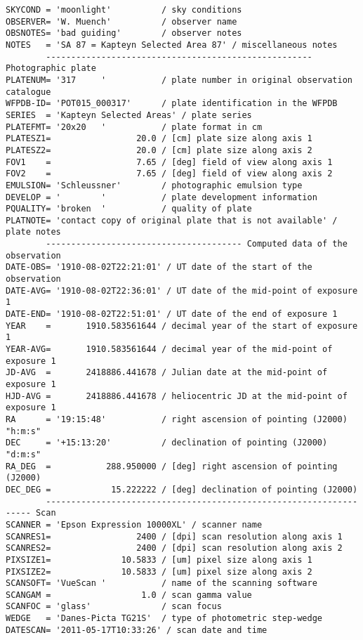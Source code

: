 \documentclass[11pt]{ivoa}
\begin{document}
\begin{lstlisting}
SKYCOND = 'moonlight'          / sky conditions
OBSERVER= 'W. Muench'          / observer name
OBSNOTES= 'bad guiding'        / observer notes
NOTES   = 'SA 87 = Kapteyn Selected Area 87' / miscellaneous notes
        ----------------------------------------------------- Photographic plate
PLATENUM= '317     '           / plate number in original observation catalogue
WFPDB-ID= 'POT015_000317'      / plate identification in the WFPDB
SERIES  = 'Kapteyn Selected Areas' / plate series
PLATEFMT= '20x20   '           / plate format in cm
PLATESZ1=                 20.0 / [cm] plate size along axis 1
PLATESZ2=                 20.0 / [cm] plate size along axis 2
FOV1    =                 7.65 / [deg] field of view along axis 1
FOV2    =                 7.65 / [deg] field of view along axis 2
EMULSION= 'Schleussner'        / photographic emulsion type
DEVELOP = '        '           / plate development information
PQUALITY= 'broken  '           / quality of plate
PLATNOTE= 'contact copy of original plate that is not available' / plate notes
        --------------------------------------- Computed data of the observation
DATE-OBS= '1910-08-02T22:21:01' / UT date of the start of the observation
DATE-AVG= '1910-08-02T22:36:01' / UT date of the mid-point of exposure 1
DATE-END= '1910-08-02T22:51:01' / UT date of the end of exposure 1
YEAR    =       1910.583561644 / decimal year of the start of exposure 1
YEAR-AVG=       1910.583561644 / decimal year of the mid-point of exposure 1
JD-AVG  =       2418886.441678 / Julian date at the mid-point of exposure 1
HJD-AVG =       2418886.441678 / heliocentric JD at the mid-point of exposure 1 
RA      = '19:15:48'           / right ascension of pointing (J2000) "h:m:s"
DEC     = '+15:13:20'          / declination of pointing (J2000) "d:m:s"
RA_DEG  =           288.950000 / [deg] right ascension of pointing (J2000)
DEC_DEG =            15.222222 / [deg] declination of pointing (J2000)
        ------------------------------------------------------------------- Scan
SCANNER = 'Epson Expression 10000XL' / scanner name
SCANRES1=                 2400 / [dpi] scan resolution along axis 1
SCANRES2=                 2400 / [dpi] scan resolution along axis 2
PIXSIZE1=              10.5833 / [um] pixel size along axis 1
PIXSIZE2=              10.5833 / [um] pixel size along axis 2
SCANSOFT= 'VueScan '           / name of the scanning software
SCANGAM =                  1.0 / scan gamma value
SCANFOC = 'glass'              / scan focus
WEDGE   = 'Danes-Picta TG21S'  / type of photometric step-wedge
DATESCAN= '2011-05-17T10:33:26' / scan date and time

\end{lstlisting}
\end{document}
